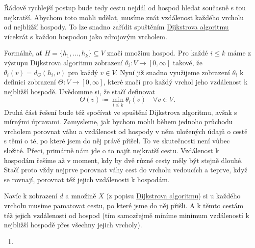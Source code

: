 Řádově rychlejší postup bude tedy cestu nejdál od hospod hledat současně s tou
nejkratší. Abychom toto mohli udělat, musíme znát vzdálenost každého vrcholu od
nejbližší hospody. To lze snadno zařídit spuštěním
\hyperref[alg:dijkstra]{Dijkstrova algoritmu} vícekrát s každou hospodou jako
zdrojovým vrcholem.

Formálně, ať $H = \{h_1,\ldots,h_k\} \subseteq V$ značí množinu hospod. Pro
každé $i \leq k$ máme z výstupu Dijkstrova algoritmu zobrazení $\theta_i:V \to
[0,\infty]$ takové, že $\theta_i(v) = d_G(h_i,v)$ pro každý $v \in V$. Nyní již
snadno využijeme zobrazení $\theta_i$ k definici zobrazení $\Theta:V \to
[0,\infty]$, které značí pro každý vrchol jeho vzdálenost k nejbližší hospodě.
Uvědomme si, že stačí definovat
\[
 \Theta(v) \coloneqq \min_{i \leq k} \theta_i(v) \quad \forall v \in V.
\]
Druhá část řešení bude též spočívat ve spuštění Dijkstrova algoritmu, a\-však s
mírnými úpravami. Zamysleme, jak bychom mohli během jednoho průchodu vrcholem
porovnat váhu a vzdálenost od hospody v něm uložených údajů o cestě s těmi o té,
po které jsem do něj právě přišel. To ve skutečnosti není vůbec složité. Přeci,
primárně nám jde o to najít nejkratší cestu. Vzdálenost k hospodám řešíme až v
moment, kdy by dvě různé cesty měly být stejně dlouhé. Stačí proto vždy nejprve
porovnat váhy cest do vrcholu vedoucích a teprve, když se rovnají, porovnat též
jejich vzdálenosti k hospodám.

Navíc k zobrazení $d$ a množině $X$ (z popisu \hyperref[alg:dijkstra]{Dijkstrova
algoritmu}) si u každého vrcholu musíme pamatovat cestu, po které jsme do něj
přišli. A k těmto cestám též jejich vzdálenosti od hospod (tím samozřejmě míníme
minimum vzdáleností k nejbližší hospodě přes všechny jejich vrcholy). 
\begin{enumerate}
 \item 
\end{enumerate}
